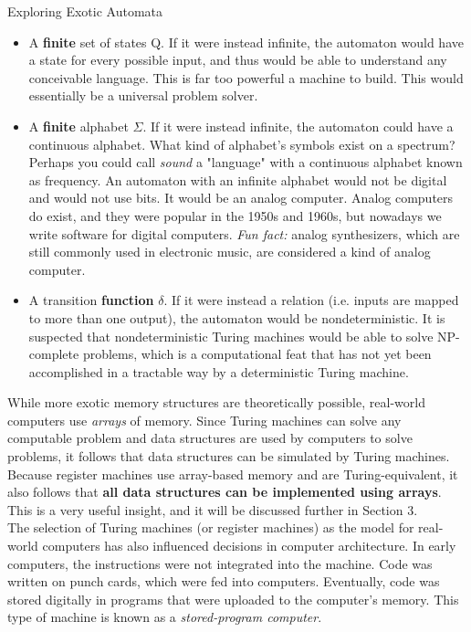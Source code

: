 \begin{bluebox}{Exploring Exotic Automata}
    \begin{itemize}
        \item A \textbf{finite} set of states Q. If it were instead infinite, the automaton would have a state for every possible input, and thus would be able to understand any conceivable language. This is far too powerful a machine to build. This would essentially be a universal problem solver.
        \item A \textbf{finite} alphabet $\Sigma$. If it were instead infinite, the automaton could have a continuous alphabet. What kind of alphabet's symbols exist on a spectrum? Perhaps you could call \textit{sound} a "language" with a continuous alphabet known as frequency. An automaton with an infinite alphabet would not be digital and would not use bits. It would be an analog computer. Analog computers do exist, and they were popular in the 1950s and 1960s, but nowadays we write software for digital computers. \textit{Fun fact:} analog synthesizers, which are still commonly used in electronic music, are considered a kind of analog computer.
        \item A transition \textbf{function} $\delta$. If it were instead a relation (i.e. inputs are mapped to more than one output), the automaton would be nondeterministic. It is suspected that nondeterministic Turing machines would be able to solve NP-complete problems, which is a computational feat that has not yet been accomplished in a tractable way by a deterministic Turing machine.
    \end{itemize}

\end{bluebox}

While more exotic memory structures are theoretically possible, real-world computers use \textit{arrays} of memory. Since Turing machines can solve any computable problem and data structures are used by computers to solve problems, it follows that data structures can be simulated by Turing machines. Because register machines use array-based memory and are Turing-equivalent, it also follows that \textbf{all data structures can be implemented using arrays}. This is a very useful insight, and it will be discussed further in Section 3. \\

The selection of Turing machines (or register machines) as the model for real-world computers has also influenced decisions in computer architecture. In early computers, the instructions were not integrated into the machine. Code was written on punch cards, which were fed into computers. Eventually, code was stored digitally in programs that were uploaded to the computer's memory. This type of machine is known as a \textit{stored-program computer}. \\

